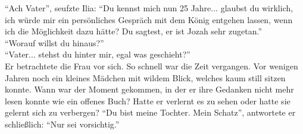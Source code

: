 ``Ach Vater'', seufzte Ilia: ``Du kennst mich nun 25 Jahre... glaubst du wirklich, ich würde mir 
ein persönliches Gespräch mit dem König entgehen lassen, wenn ich die Möglichkeit dazu hätte? Du 
sagtest, er ist Jozah sehr zugetan.''\\
``Worauf willst du hinaus?''\\
``Vater... stehst du hinter mir, egal was geschieht?''\\
Er betrachtete die Frau vor sich. So schnell war die Zeit vergangen. Vor wenigen Jahren noch ein 
kleines Mädchen mit wildem Blick, welches kaum still sitzen konnte. Wann war der Moment gekommen, 
in der er ihre Gedanken nicht mehr lesen konnte wie ein offenes Buch? Hatte er verlernt es zu sehen 
oder hatte sie gelernt sich zu verbergen? ``Du bist meine Tochter. Mein Schatz'', antwortete er 
schließlich: ``Nur sei vorsichtig.''\\

